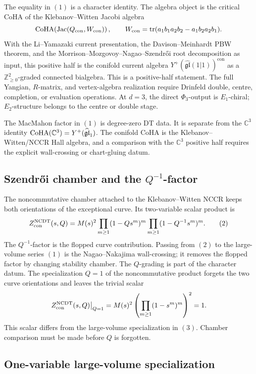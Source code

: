 The equality in \((1)\) is a character identity.  The algebra object is
the critical CoHA of the Klebanov--Witten Jacobi algebra
\[
  \mathrm{CoHA}\!\left(\mathrm{Jac}(Q_{\mathrm{con}},W_{\mathrm{con}})\right),
  \qquad
  W_{\mathrm{con}}
  =
  \operatorname{tr}(a_1b_1a_2b_2-a_1b_2a_2b_1).
\]
With the Li--Yamazaki current presentation, the Davison--Meinhardt PBW
theorem, and the Morrison--Mozgovoy--Nagao--Szendr\H{o}i root
decomposition as input, this positive half is the conifold current
algebra \(Y^+(\widehat{\mathfrak{gl}}(1|1))^{\mathrm{con}}\) as a
\(\mathbb Z_{\geq 0}^2\)-graded connected bialgebra.  This is a
positive-half statement.  The full Yangian, \(R\)-matrix, and
vertex-algebra realization require Drinfeld double, centre, completion,
or evaluation operations.  At \(d=3\), the direct \(\Phi_3\)-output is
\(E_1\)-chiral; \(E_2\)-structure belongs to the centre or double stage.

The MacMahon factor in \((1)\) is degree-zero DT data.  It is separate
from the \(\mathbb C^3\) identity
\(\mathrm{CoHA}(\mathbb C^3)=Y^+(\widehat{\mathfrak{gl}}_1)\).  The conifold
CoHA is the Klebanov--Witten/NCCR Hall algebra, and a comparison with
the \(\mathbb C^3\) positive half requires the explicit wall-crossing
or chart-gluing datum.

\subsection*{Szendr\H{o}i chamber and the \(Q^{-1}\)-factor}

The noncommutative chamber attached to the Klebanov--Witten NCCR keeps
both orientations of the exceptional curve.  Its two-variable scalar
product is
\[
  Z^{\mathrm{NCDT}}_{\mathrm{con}}(s,Q)
  =
  M(s)^2
  \prod_{m\geq 1}(1-Qs^m)^m
  \prod_{m\geq 1}(1-Q^{-1}s^m)^m .
  \tag{2}
\]
The \(Q^{-1}\)-factor is the flopped curve contribution.  Passing from
\((2)\) to the large-volume series \((1)\) is the Nagao--Nakajima
wall-crossing; it removes the flopped factor by changing stability
chamber.  The \(Q\)-grading is part of the character datum.
The specialization \(Q=1\) of the noncommutative product forgets the two
curve orientations and leaves the trivial scalar
\[
  \left. Z^{\mathrm{NCDT}}_{\mathrm{con}}(s,Q)\right|_{Q=1}
  =
  M(s)^2
  \left(\prod_{m\geq 1}(1-s^m)^m\right)^2
  =
  1.
\]
This scalar differs from the large-volume specialization in \((3)\).
Chamber comparison must be made before \(Q\) is forgotten.

\subsection*{One-variable large-volume specialization}

